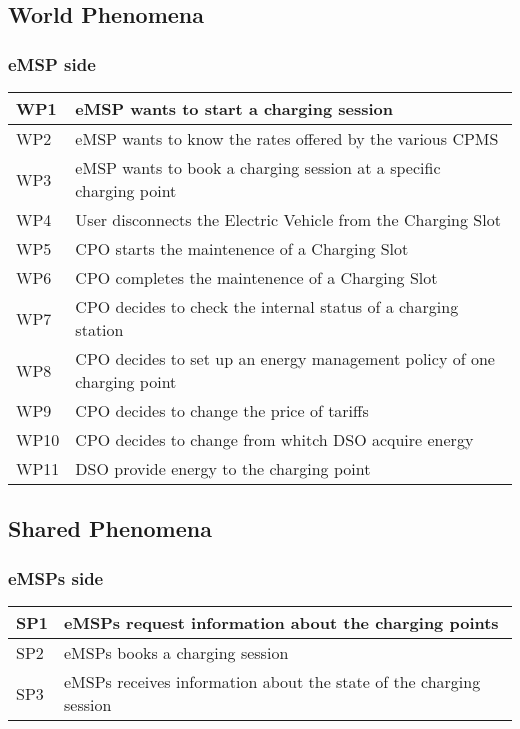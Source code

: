 \documentclass[12pt]{article}
\begin{document}
\subsection{World Phenomena}

\subsubsection{eMSP side}
\begin{tabular}{|l|l|}
	\hline
	WP1 & eMSP wants to start a charging session\\
	\hline
	WP2 & eMSP wants to know the rates offered by the various CPMS\\
	\hline
	WP3 & eMSP wants to book a charging session at a specific charging point\\
	\hline
	WP4 & User disconnects the Electric Vehicle from the Charging Slot\\
	\hline
	WP5 & CPO starts the maintenence of a Charging Slot\\
	\hline
	WP6 & CPO completes the maintenence of a Charging Slot\\
	\hline
	WP7 & CPO decides to check the internal status of a charging station\\
	\hline
	WP8 & CPO decides to set up an energy management policy of one charging point\\
	\hline
	WP9 & CPO decides to change the price of tariffs\\
	\hline
	WP10 & CPO decides to change from whitch DSO acquire energy\\
	\hline
	WP11 & DSO provide energy to the charging point\\
	\hline
\end{tabular}


\subsection{Shared Phenomena}
\subsubsection{eMSPs side}
\begin{tabular}{|l|l|}
	\hline
	SP1 & eMSPs request information about the charging points\\
	\hline
	SP2 & eMSPs books a charging session \\
	\hline
	SP3 & eMSPs receives information about the state of the charging session\\
	\hline
\end{tabular}
\end{document}
